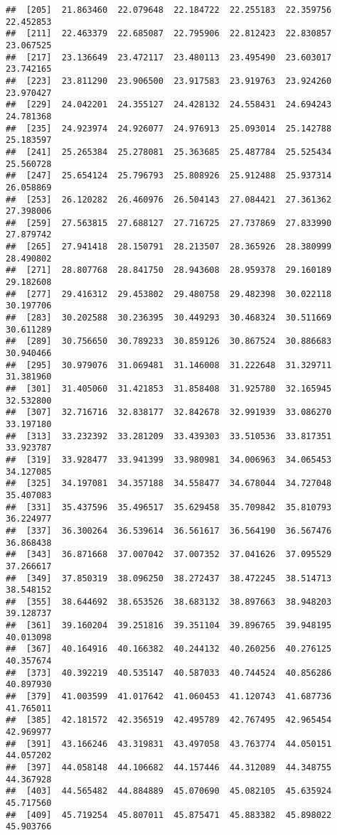 \documentclass[]{article}
\begin{document}
\begin{verbatim}
##  [205]  21.863460  22.079648  22.184722  22.255183  22.359756  22.452853
##  [211]  22.463379  22.685087  22.795906  22.812423  22.830857  23.067525
##  [217]  23.136649  23.472117  23.480113  23.495490  23.603017  23.742165
##  [223]  23.811290  23.906500  23.917583  23.919763  23.924260  23.970427
##  [229]  24.042201  24.355127  24.428132  24.558431  24.694243  24.781368
##  [235]  24.923974  24.926077  24.976913  25.093014  25.142788  25.183597
##  [241]  25.265384  25.278081  25.363685  25.487784  25.525434  25.560728
##  [247]  25.654124  25.796793  25.808926  25.912488  25.937314  26.058869
##  [253]  26.120282  26.460976  26.504143  27.084421  27.361362  27.398006
##  [259]  27.563815  27.688127  27.716725  27.737869  27.833990  27.879742
##  [265]  27.941418  28.150791  28.213507  28.365926  28.380999  28.490802
##  [271]  28.807768  28.841750  28.943608  28.959378  29.160189  29.182608
##  [277]  29.416312  29.453802  29.480758  29.482398  30.022118  30.197706
##  [283]  30.202588  30.236395  30.449293  30.468324  30.511669  30.611289
##  [289]  30.756650  30.789233  30.859126  30.867524  30.886683  30.940466
##  [295]  30.979076  31.069481  31.146008  31.222648  31.329711  31.381960
##  [301]  31.405060  31.421853  31.858408  31.925780  32.165945  32.532800
##  [307]  32.716716  32.838177  32.842678  32.991939  33.086270  33.197180
##  [313]  33.232392  33.281209  33.439303  33.510536  33.817351  33.923787
##  [319]  33.928477  33.941399  33.980981  34.006963  34.065453  34.127085
##  [325]  34.197081  34.357188  34.558477  34.678044  34.727048  35.407083
##  [331]  35.437596  35.496517  35.629458  35.709842  35.810793  36.224977
##  [337]  36.300264  36.539614  36.561617  36.564190  36.567476  36.868438
##  [343]  36.871668  37.007042  37.007352  37.041626  37.095529  37.266617
##  [349]  37.850319  38.096250  38.272437  38.472245  38.514713  38.548152
##  [355]  38.644692  38.653526  38.683132  38.897663  38.948203  39.128737
##  [361]  39.160204  39.251816  39.351104  39.896765  39.948195  40.013098
##  [367]  40.164916  40.166382  40.244132  40.260256  40.276125  40.357674
##  [373]  40.392219  40.535147  40.587033  40.744524  40.856286  40.897930
##  [379]  41.003599  41.017642  41.060453  41.120743  41.687736  41.765011
##  [385]  42.181572  42.356519  42.495789  42.767495  42.965454  42.969977
##  [391]  43.166246  43.319831  43.497058  43.763774  44.050151  44.057202
##  [397]  44.058148  44.106682  44.157446  44.312089  44.348755  44.367928
##  [403]  44.565482  44.884889  45.070690  45.082105  45.635924  45.717560
##  [409]  45.719254  45.807011  45.875471  45.883382  45.898022  45.903766

\end{verbatim}
\end{document}
